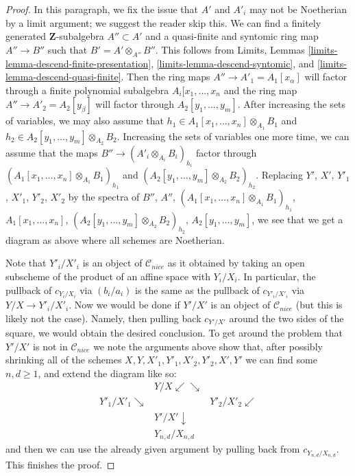 \begin{proof}
\medskip\noindent
In this paragraph, we fix the issue that $A'$ and $A'_i$ may not be Noetherian
by a limit argument; we suggest the reader skip this.
We can find a finitely generated $\mathbf{Z}$-subalgebra
$A'' \subset A'$ and a quasi-finite and syntomic ring map
$A'' \to B''$ such that $B' = A' \otimes_{A''} B''$.
This follows from Limits, Lemmas
\ref{limits-lemma-descend-finite-presentation},
\ref{limits-lemma-descend-syntomic}, and
\ref{limits-lemma-descend-quasi-finite}.
Then the ring maps $A'' \to A'_1 = A_1[x_\alpha]$ will factor through a finite
polynomial subalgebra $A_i[x_1, \ldots, x_n$ and the ring map
$A'' \to A'_2 = A_2[y_\beta]$ will factor through $A_2[y_1, \ldots, y_m]$.
After increasing the sets of variables, we may also assume that
$h_1 \in A_1[x_1, \ldots, x_n] \otimes_{A_1} B_1$ and
$h_2 \in A_2[y_1, \ldots, y_m] \otimes_{A_2} B_2$.
Increasing the sets of variables one more time, we can assume
that the maps $B'' \to (A'_i \otimes_{A_i} B_i)_{h_i}$
factor through $(A_1[x_1, \ldots, x_n] \otimes_{A_1} B_1)_{h_1}$
and $(A_2[y_1, \ldots, y_m] \otimes_{A_2} B_2)_{h_2}$.
Replacing $Y'$, $X'$, $Y'_1$, $X'_1$, $Y'_2$, $X'_2$ by the spectra of
$B''$, $A''$, $(A_1[x_1, \ldots, x_n] \otimes_{A_1} B_1)_{h_1}$,
$A_1[x_1, \ldots, x_n]$, $(A_2[y_1, \ldots, y_m] \otimes_{A_2} B_2)_{h_2}$,
$A_2[y_1, \ldots, y_m]$, we see that we get a diagram as above
where all schemes are Noetherian.

\medskip\noindent
Note that $Y'_i/X'_i$ is an object of $\mathcal{C}_{nice}$ as it
obtained by taking an open subscheme of the product of an affine space
with $Y_i/X_i$. In particular, the pullback of
$c_{Y_i/X_i}$ via $(b_i/a_i)$ is the same as the pullback of
$c_{Y'_i/X'_i}$ via $Y/X \to Y'_i/X'_i$.
Now we would be done if $Y'/X'$ is an object of $\mathcal{C}_{nice}$
(but this is likely not the case). Namely, then pulling back $c_{Y'/X'}$
around the two sides of the square, we would obtain the desired conclusion.
To get around the problem that $Y'/X'$ is not in $\mathcal{C}_{nice}$
we note the arguments above show that, after possibly shrinking all
of the schemes $X, Y, X'_1, Y'_1, X'_2, Y'_2, X', Y'$ we can find some
$n, d \geq 1$, and extend the diagram like so:
$$
\begin{array}{ccc} & Y/X \swarrow\searrow &  \\ Y'_1/X'_1 \searrow &  & Y'_2/X'_2 \swarrow \\  & Y'/X' \downarrow &  \\  & Y_{n, d}/X_{n, d} & \end{array}
$$
and then we can use the already given argument by pulling
back from $c_{Y_{n, d}/X_{n, d}}$. This finishes the proof.
\end{proof}

